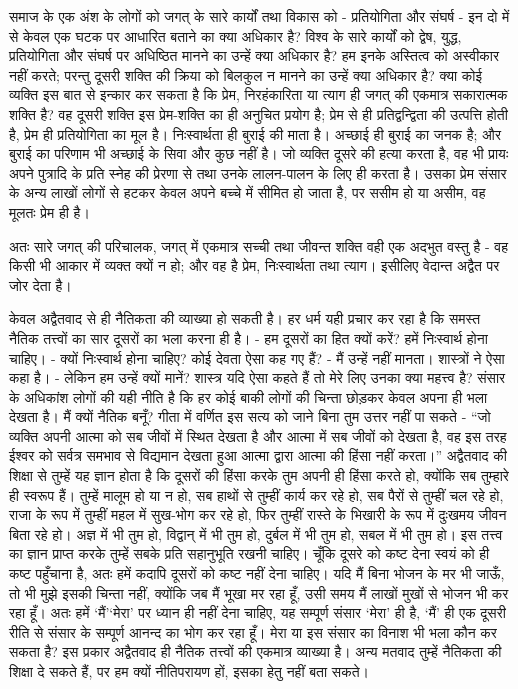 समाज के एक अंश के लोगों को जगत् के सारे कार्यों तथा विकास को - प्रतियोगिता और संघर्ष - इन दो में से केवल एक घटक पर आधारित बताने का क्या अधिकार है? विश्व के सारे कार्यों को द्वेष, युद्ध, प्रतियोगिता और संघर्ष पर अधिष्ठित मानने का उन्हें क्या अधिकार है? हम इनके अस्तित्व को अस्वीकार नहीं करते; परन्तु दूसरी शक्ति की क्रिया को बिलकुल न मानने का उन्हें क्या अधिकार है? क्या कोई व्यक्ति इस बात से इन्कार कर सकता है कि प्रेम, निरहंकारिता या त्याग ही जगत् की एकमात्र सकारात्मक शक्ति है? वह दूसरी शक्ति इस प्रेम-शक्ति का ही अनुचित प्रयोग है; प्रेम से ही प्रतिद्वन्द्विता की उत्पत्ति होती है, प्रेम ही प्रतियोगिता का मूल है। निःस्वार्थता ही बुराई की माता है। अच्छाई ही बुराई का जनक है; और बुराई का परिणाम भी अच्छाई के सिवा और कुछ नहीं है। जो व्यक्ति दूसरे की हत्या करता है, वह भी प्रायः अपने पुत्रादि के प्रति स्नेह की प्रेरणा से तथा उनके लालन-पालन के लिए ही करता है। उसका प्रेम संसार के अन्य लाखों लोगों से हटकर केवल अपने बच्चे में सीमित हो जाता है, पर ससीम हो या असीम, वह मूलतः प्रेम ही है। 

अतः सारे जगत् की परिचालक, जगत् में एकमात्र सच्ची तथा जीवन्त शक्ति वही एक अदभुत वस्तु है - वह किसी भी आकार में व्यक्त क्यों न हो; और वह है प्रेम, निःस्वार्थता तथा त्याग। इसीलिए वेदान्त अद्वैत पर जोर देता है। 

केवल अद्वैतवाद से ही नैतिकता की व्याख्या हो सकती है। हर धर्म यही प्रचार कर रहा है कि समस्त नैतिक तत्त्वों का सार दूसरों का भला करना ही है। - हम दूसरों का हित क्यों करें? हमें निःस्वार्थ होना चाहिए। - क्यों निःस्वार्थ होना चाहिए? कोई देवता ऐसा कह गए हैं? - मैं उन्हें नहीं मानता। शास्त्रों ने ऐसा कहा है। - लेकिन हम उन्हें क्यों मानें? शास्त्र यदि ऐसा कहते हैं तो मेरे लिए उनका क्या महत्त्व है? संसार के अधिकांश लोगों की यही नीति है कि हर कोई बाकी लोगों की चिन्ता छोड़कर केवल अपना ही भला देखता है। मैं क्यों नैतिक बनूँ? गीता में वर्णित इस सत्य को जाने बिना तुम उत्तर नहीं पा सकते - “जो व्यक्ति अपनी आत्मा को सब जीवों में स्थित देखता है और आत्मा में सब जीवों को देखता है, वह इस तरह ईश्वर को सर्वत्र समभाव से विद्यमान देखता हुआ आत्मा द्वारा आत्मा की हिंसा नहीं करता।” अद्वैतवाद की शिक्षा से तुम्हें यह ज्ञान होता है कि दूसरों की हिंसा करके तुम अपनी ही हिंसा करते हो, क्योंकि सब तुम्हारे ही स्वरूप हैं। तुम्हें मालूम हो या न हो, सब हाथों से तुम्हीं कार्य कर रहे हो, सब पैरों से तुम्हीं चल रहे हो, राजा के रूप में तुम्हीं महल में सुख-भोग कर रहे हो, फिर तुम्हीं रास्ते के भिखारी के रूप में दुःखमय जीवन बिता रहे हो। अज्ञ में भी तुम हो, विद्वान् में भी तुम हो, दुर्बल में भी तुम हो, सबल में भी तुम हो। इस तत्त्व का ज्ञान प्राप्त करके तुम्हें सबके प्रति सहानुभूति रखनी चाहिए। चूँकि दूसरे को कष्ट देना स्वयं को ही कष्ट पहुँचाना है, अतः हमें कदापि दूसरों को कष्ट नहीं देना चाहिए। यदि मैं बिना भोजन के मर भी जाऊँ, तो भी मुझे इसकी चिन्ता नहीं, क्योंकि जब मैं भूखा मर रहा हूँ, उसी समय मैं लाखों मुखों से भोजन भी कर रहा हूँ। अतः हमें ‘मैं’‘मेरा’ पर ध्यान ही नहीं देना चाहिए, यह सम्पूर्ण संसार ‘मेरा’ ही है, ‘मैं’ ही एक दूसरी रीति से संसार के सम्पूर्ण आनन्द का भोग कर रहा हूँ। मेरा या इस संसार का विनाश भी भला कौन कर सकता है? इस प्रकार अद्वैतवाद ही नैतिक तत्त्वों की एकमात्र व्याख्या है। अन्य मतवाद तुम्हें नैतिकता की शिक्षा दे सकते हैं, पर हम क्यों नीतिपरायण हों, इसका हेतु नहीं बता सकते। 

